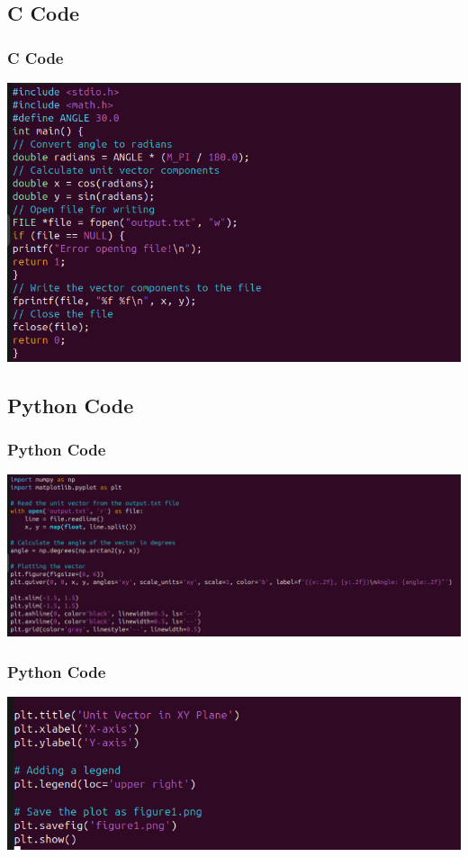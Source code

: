 \documentclass{beamer}
\theoremstyle{remark}
\numberwithin{equation}{section}
\begin{document}
\subsection{C Code}
\begin{frame}
\frametitle{C Code}
    \begin{center}
\includegraphics[width=1\textwidth]{figs/figure2.png}
\end{center}
\end{frame}

\subsection{Python Code}
\begin{frame}
\frametitle{Python Code}
    \begin{center}
\includegraphics[width=1\textwidth]{figs/figure3.png}
\end{center}
\end{frame}

\begin{frame}
\frametitle{Python Code}
    \begin{center}
\includegraphics[width=1\textwidth]{figs/figure4.png}
\end{center}
\end{frame}
\end{document}
